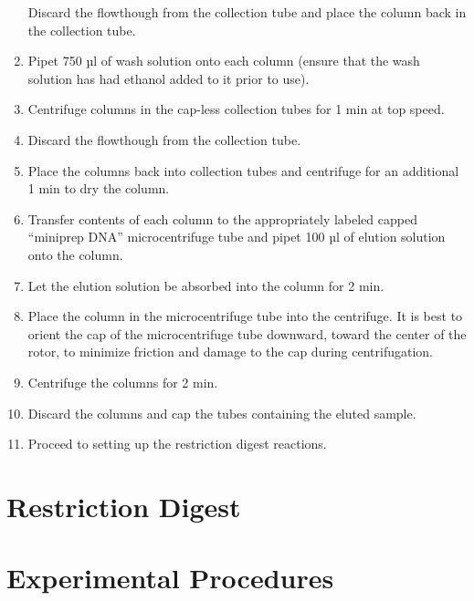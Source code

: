 \documentclass[]{book}
\begin{document}
\begin{enumerate}
  Discard the flowthough from the collection tube and place the column back in the collection tube.
\item
  Pipet 750 µl of wash solution onto each column (ensure that the wash solution has had ethanol added to it prior to use).
\item
  Centrifuge columns in the cap-less collection tubes for 1 min at top speed.
\item
  Discard the flowthough from the collection tube.
\item
  Place the columns back into collection tubes and centrifuge for an additional 1 min to dry the column.
\item
  Transfer contents of each column to the appropriately labeled capped ``miniprep DNA'' microcentrifuge tube and pipet 100 µl of elution solution onto the column.
\item
  Let the elution solution be absorbed into the column for 2 min.
\item
  Place the column in the microcentrifuge tube into the centrifuge. It is best to orient the cap of the microcentrifuge tube downward, toward the center of the rotor, to minimize friction and damage to the cap during centrifugation.
\item
  Centrifuge the columns for 2 min.
\item
  Discard the columns and cap the tubes containing the eluted sample.
\item
  Proceed to setting up the restriction digest reactions.
\end{enumerate}

\hypertarget{restriction-digest}{%
\section{Restriction Digest}\label{restriction-digest}}

\hypertarget{experimental-procedures-17}{%
\section{Experimental Procedures}\label{experimental-procedures-17}}
\end{document}
